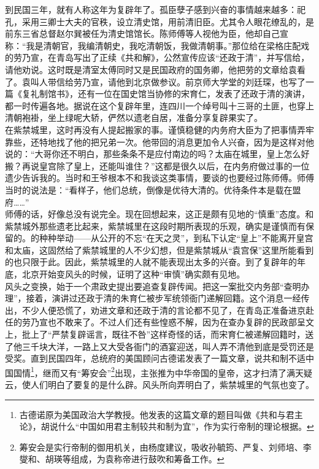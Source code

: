 到民国三年，就有人称这年为复辟年了。孤臣孽子感到兴奋的事情越来越多：祀孔，采用三卿士大夫的官秩，设立清史馆，用前清旧臣。尤其令人眼花缭乱的，是前东三省总督赵尔巽被任为清史馆馆长。陈师傅等人视他为臣，他却自己宣称：“我是清朝官，我编清朝史，我吃清朝饭，我做清朝事。”那位给在梁格庄配戏的劳乃宣，在青岛写出了正续《共和解》，公然宣传应该“还政于清”，并写信给，请他劝说。这时既是清室太傅同时又是民国政府的国务卿，他把劳的文章给袁看了。袁叫人带信给劳乃宣，请他到北京做参议。前京师大学堂的刘廷琛，也写了一篇《复礼制馆书》，还有一位在国史馆当协修的宋育仁，发表了还政于清的演讲，都一时传遍各地。据说在这个复辟年里，连四川一个绰号叫十三哥的土匪，也穿上清朝袍褂，坐上绿呢大轿，俨然以遗老自居，准备分享复辟果实了。\\

在紫禁城里，这时再没有人提起搬家的事。谨慎稳健的内务府大臣为了把事情弄牢靠些，还特地找了他的把兄弟一次。他带回的消息更加令人兴奋，因为是这样对他说的：“大哥你还不明白，那些条条不是应付南边的吗？太庙在城里，皇上怎么好搬？再说皇宫除了皇上，还能叫谁住？”这都是很久以后，在内务府做过事的一位遗少告诉我的。当时和王爷根本不和我谈这类事情，要谈的也要经过陈师傅。师傅当时的说法是：“看样子，他们总统，倒像是优待大清的。优待条件本是载在盟府……”\\

师傅的话，好像总没有说完全。现在回想起来，这正是颇有见地的“慎重”态度。和紫禁城外那些遗老比起来，紫禁城里在这段时期所表现的乐观，确实是谨慎而有保留的。的种种举动——从公开的不忘“在天之灵”，到私下认定“皇上”不能离开皇宫和太庙，这固然给了紫禁城里的人不少幻想，但是紫禁城从“袁宫保”这里所能看到的也只限于此。因此，紫禁城里的人就不能表现出太多的兴奋。到了复辟年的年底，北京开始变风头的时候，证明了这种“审慎”确实颇有见地。\\

风头之变换，始于一个肃政史提出要追查复辟传闻。把这一案批交内务部“查明办理”，接着，演讲过还政于清的朱育仁被步军统领衙门递解回籍。这个消息一经传出，不少人便恐慌了，劝进文章和还政于清的言论都不见了，在青岛正准备进京赴任的劳乃宣也不敢来了。不过人们还有些惶惑不解，因为在查办复辟的民政部呈文上，批上了“严禁复辟谣言，既往不咎”这样奇怪的话，而宋育仁被递解回籍时，送了他三千块大洋，一路上又大受各衙门的酒宴迎送，叫人弄不清他到底是受罚还是受奖。直到民国四年，总统府的美国顾问古德诺发表了一篇文章，说共和制不适中国国情\footnote{古德诺原为美国政治大学教授。他发表的这篇文章的题目叫做《共和与君主论》，胡说什么“中国如用君主制较共和制为宜”，作为实行帝制的理论根据。}，继而又有“筹安会”\footnote{筹安会是实行帝制的御用机关，由杨度建议，吸收孙毓筠、严复、刘师培、李燮和、胡瑛等组成，为袁称帝进行鼓吹和筹备工作。}出现，主张推为中华帝国的皇帝，这才扫清了满天疑云，使人们明白了要复的是什么辟。风头所向弄明白了，紫禁城里的气氛也变了。\\

